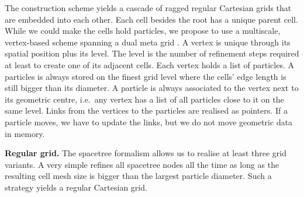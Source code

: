 The construction scheme yields a cascade of ragged regular Cartesian grids that
are embedded into each other.
Each cell besides the root has a unique parent cell.
While we could make the cells hold particles, we propose to use a
multiscale, vertex-based scheme spanning a dual meta grid
\cite{Weinzierl:16:PIC}.
A vertex is unique through its spatial position plus its level. 
The level is the number of refinement steps required at least to create one of
its adjacent cells.
Each vertex holds a list of particles.
A particles is always stored on the finest grid level where the cells' edge
length is still bigger than its diameter.
A particle is always associated to the vertex next to its geometric centre,
i.e.~any vertex has a list of all particles close to it on the same level.
Links from the vertices to the particles are realised as pointers. 
If a particle moves, we have to update the links, but we do not move
geometric data in memory.




{\bf Regular grid.}
The spacetree formalism allows us to realise at least three grid variants. 
A very simple refines all spacetree nodes all the time as long as the resulting
cell mesh size is bigger than the largest particle diameter.
Such a strategy yields a regular Cartesian grid. 



